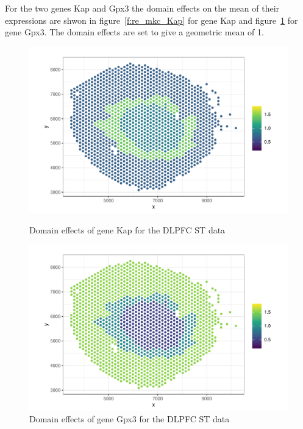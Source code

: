 \documentclass{article}\usepackage[]{graphicx}\usepackage[]{xcolor}
\makeatletter
\def\maxwidth{ %
  \ifdim\Gin@nat@width>\linewidth
    \linewidth
  \else
    \Gin@nat@width
  \fi
}
\newenvironment{knitrout}{}{} %
\makeatother
\begin{document}
For the two genes Kap and Gpx3 the domain effects on the mean of their expressions are shwon in figure~\ref{f:re_mkc_Kap} for gene Kap and figure~\ref{f:re_mkc_Gpx3} for gene Gpx3. The domain effects are set to give a geometric mean of 1.

\begin{figure}[h]
\begin{minipage}[c]{0.5\textwidth}
\begin{knitrout}
\color{fgcolor}

{\centering \includegraphics[width=\maxwidth]{plots/pc9-1} 

}


\end{knitrout}
  \caption{Domain effects of gene Kap for the DLPFC ST data}
\label{f:re_mkc_Kap}
\end{minipage}
\hfill
\begin{minipage}[c]{0.5\textwidth}
\begin{knitrout}
\color{fgcolor}

{\centering \includegraphics[width=\maxwidth]{plots/pc10-1} 

}


\end{knitrout}
  \caption{Domain effects of gene Gpx3 for the DLPFC ST data}
\label{f:re_mkc_Gpx3}
\end{minipage}
\end{figure}
\end{document}
